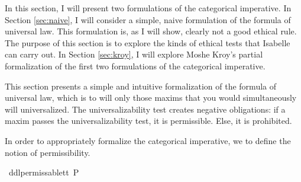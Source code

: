 %
\begin{isabellebody}%
%
%
\isadelimtheory
%
\endisadelimtheory
%
\isatagtheory
%
\endisatagtheory
{\isafoldtheory}%
%
\isadelimtheory
%
\endisadelimtheory
%
\isadelimdocument
%
\endisadelimdocument
%
\isatagdocument
%
\isamarkuptrue%
%
\endisatagdocument
{\isafolddocument}%
%
\isadelimdocument
%
\endisadelimdocument
%
\begin{isamarkuptext}%
In this section, I will present two formulations of the categorical imperative. In Section \ref{sec:naive}, I will 
consider a simple, naive formulation of the formula of universal law. This formulation is, as I will 
show, clearly not a good ethical rule. The purpose of this section is to explore the kinds of ethical
tests that Isabelle can carry out. In Section \ref{sec:kroy}, I will explore Moshe Kroy's \cite{kroy} partial formalization of 
the first two formulations of the categorical imperative.%
\end{isamarkuptext}\isamarkuptrue%
%
\isadelimdocument
%
\endisadelimdocument
%
\isatagdocument
%
\isamarkuptrue%
%
\endisatagdocument
{\isafolddocument}%
%
\isadelimdocument
%
\endisadelimdocument
%
\begin{isamarkuptext}%
This section presents a simple and intuitive formalization of the formula of universal law, which 
is to will only those maxims that you would simultaneously will universalized. The universalizability 
test creates negative obligations: if a maxim passes the universalizability test, it is permissible. Else,
it is prohibited.%
\end{isamarkuptext}\isamarkuptrue%
%
\isadelimdocument
%
\endisadelimdocument
%
\isatagdocument
%
\isamarkuptrue%
%
\endisatagdocument
{\isafolddocument}%
%
\isadelimdocument
%
\endisadelimdocument
%
\begin{isamarkuptext}%
In order to appropriately formalize the categorical imperative, we to define the notion of permissibility.%
\end{isamarkuptext}\isamarkuptrue%
\isamarkupfalse%
\ ddlpermissable{\isacharcolon}{\isacharcolon}{\isachardoublequoteopen}t{\isasymRightarrow}t{\isachardoublequoteclose}\ {\isacharparenleft}{\isachardoublequoteopen}P{\isacharunderscore}{\isachardoublequoteclose}{\isacharparenright}\isanewline

\end{isabellebody}
